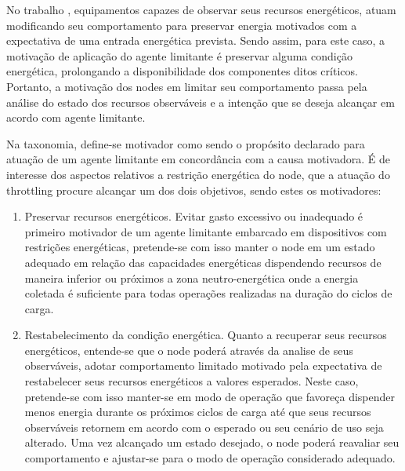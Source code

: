 No trabalho \cite{zhang_toward_2018}, equipamentos capazes de observar seus recursos energéticos, atuam modificando seu comportamento para preservar energia motivados com a expectativa de uma entrada energética prevista. Sendo assim, para este caso, a motivação de aplicação do agente limitante é preservar alguma condição energética, prolongando a disponibilidade dos componentes ditos críticos. Portanto, a motivação dos nodes em limitar seu comportamento passa pela análise do estado dos recursos observáveis e a intenção que se deseja alcançar em acordo com agente limitante.

Na taxonomia, define-se motivador como sendo o propósito declarado para atuação de um agente limitante em concordância com a causa motivadora. É de interesse dos aspectos relativos a restrição energética do node, que a atuação do throttling procure alcançar um dos dois objetivos, sendo estes os motivadores:

\begin{enumerate}
	\item Preservar recursos energéticos. 
	Evitar gasto excessivo ou inadequado é primeiro motivador de um agente limitante embarcado em dispositivos com restrições energéticas, pretende-se com isso manter o node em um estado adequado em relação das capacidades energéticas dispendendo recursos de maneira inferior ou próximos a zona neutro-energética onde a energia coletada é suficiente para todas operações realizadas na duração do ciclos de carga.
	
	\item Restabelecimento da condição energética.
	Quanto a recuperar seus recursos energéticos, entende-se que o node poderá através da analise de seus observáveis, adotar comportamento limitado motivado pela expectativa de restabelecer seus recursos energéticos a valores esperados. Neste caso, pretende-se com isso manter-se em modo de operação que favoreça dispender menos energia durante os próximos ciclos de carga até que seus recursos observáveis retornem em acordo com o esperado ou seu cenário de uso seja alterado. Uma vez alcançado um estado desejado, o node poderá reavaliar seu comportamento e ajustar-se para o modo de operação considerado adequado. 
\end{enumerate}





